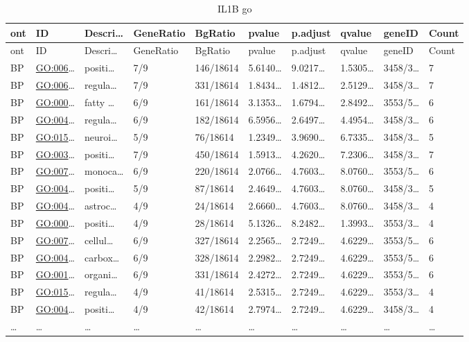 \documentclass[
]{article}
\begin{document}
\begin{longtable}[]{@{}llllllllll@{}}
\caption{\label{tab:IL1B-go}IL1B go}\tabularnewline
\toprule
ont & ID & Descri\ldots{} & GeneRatio & BgRatio & pvalue & p.adjust & qvalue & geneID & Count\tabularnewline
\midrule
\endfirsthead
\toprule
ont & ID & Descri\ldots{} & GeneRatio & BgRatio & pvalue & p.adjust & qvalue & geneID & Count\tabularnewline
\midrule
\endhead
BP & \url{GO:006}\ldots{} & positi\ldots{} & 7/9 & 146/18614 & 5.6140\ldots{} & 9.0217\ldots{} & 1.5305\ldots{} & 3458/3\ldots{} & 7\tabularnewline
BP & \url{GO:006}\ldots{} & regula\ldots{} & 7/9 & 331/18614 & 1.8434\ldots{} & 1.4812\ldots{} & 2.5129\ldots{} & 3458/3\ldots{} & 7\tabularnewline
BP & \url{GO:000}\ldots{} & fatty \ldots{} & 6/9 & 161/18614 & 3.1353\ldots{} & 1.6794\ldots{} & 2.8492\ldots{} & 3553/5\ldots{} & 6\tabularnewline
BP & \url{GO:004}\ldots{} & regula\ldots{} & 6/9 & 182/18614 & 6.5956\ldots{} & 2.6497\ldots{} & 4.4954\ldots{} & 3458/3\ldots{} & 6\tabularnewline
BP & \url{GO:015}\ldots{} & neuroi\ldots{} & 5/9 & 76/18614 & 1.2349\ldots{} & 3.9690\ldots{} & 6.7335\ldots{} & 3458/3\ldots{} & 5\tabularnewline
BP & \url{GO:003}\ldots{} & positi\ldots{} & 7/9 & 450/18614 & 1.5913\ldots{} & 4.2620\ldots{} & 7.2306\ldots{} & 3458/3\ldots{} & 7\tabularnewline
BP & \url{GO:007}\ldots{} & monoca\ldots{} & 6/9 & 220/18614 & 2.0766\ldots{} & 4.7603\ldots{} & 8.0760\ldots{} & 3553/5\ldots{} & 6\tabularnewline
BP & \url{GO:004}\ldots{} & positi\ldots{} & 5/9 & 87/18614 & 2.4649\ldots{} & 4.7603\ldots{} & 8.0760\ldots{} & 3458/3\ldots{} & 5\tabularnewline
BP & \url{GO:004}\ldots{} & astroc\ldots{} & 4/9 & 24/18614 & 2.6660\ldots{} & 4.7603\ldots{} & 8.0760\ldots{} & 3458/3\ldots{} & 4\tabularnewline
BP & \url{GO:000}\ldots{} & positi\ldots{} & 4/9 & 28/18614 & 5.1326\ldots{} & 8.2482\ldots{} & 1.3993\ldots{} & 3553/3\ldots{} & 4\tabularnewline
BP & \url{GO:007}\ldots{} & cellul\ldots{} & 6/9 & 327/18614 & 2.2565\ldots{} & 2.7249\ldots{} & 4.6229\ldots{} & 3553/5\ldots{} & 6\tabularnewline
BP & \url{GO:004}\ldots{} & carbox\ldots{} & 6/9 & 328/18614 & 2.2982\ldots{} & 2.7249\ldots{} & 4.6229\ldots{} & 3553/5\ldots{} & 6\tabularnewline
BP & \url{GO:001}\ldots{} & organi\ldots{} & 6/9 & 331/18614 & 2.4272\ldots{} & 2.7249\ldots{} & 4.6229\ldots{} & 3553/5\ldots{} & 6\tabularnewline
BP & \url{GO:015}\ldots{} & regula\ldots{} & 4/9 & 41/18614 & 2.5315\ldots{} & 2.7249\ldots{} & 4.6229\ldots{} & 3553/3\ldots{} & 4\tabularnewline
BP & \url{GO:004}\ldots{} & positi\ldots{} & 4/9 & 42/18614 & 2.7974\ldots{} & 2.7249\ldots{} & 4.6229\ldots{} & 3458/3\ldots{} & 4\tabularnewline
\ldots{} & \ldots{} & \ldots{} & \ldots{} & \ldots{} & \ldots{} & \ldots{} & \ldots{} & \ldots{} & \ldots{}\tabularnewline
\bottomrule
\end{longtable}
\end{document}
